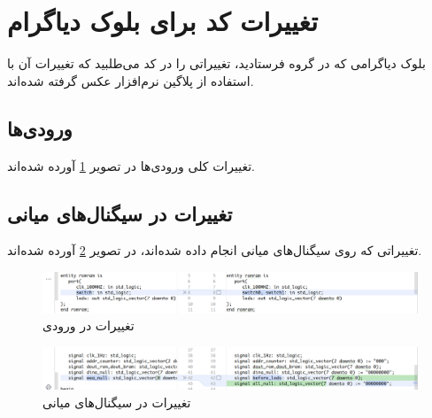 \documentclass[dvipsnames, svgnames, x11names, a4paper, 11pt]{article}
\begin{document}
\section{تغییرات کد برای بلوک دیاگرام}
بلوک دیاگرامی که در گروه فرستادید، تغییراتی را در کد 
می‌طلبید که تغییرات آن با استفاده از پلاگین  نرم‌افزار 
عکس گرفته شده‌اند.

\subsection{ورودی‌ها}
تغییرات کلی ورودی‌‌‌ها در تصویر 
\ref{fig:input-changes}
آورده شده‌اند.

\subsection{تغییرات در سیگنال‌های میانی}
تغییراتی که روی سیگنا‌ل‌های میانی انجام داده شده‌اند، در تصویر
\ref{fig:signal-changes}
آورده شده‌اند.

\begin{figure}[b]
\begin{center}
\includegraphics[width=0.90\textheight, height=0.15\textwidth, angle=90]{./images/input-switiches}
\end{center}
\caption{تغییرات در ورودی}
\label{fig:input-changes}
\end{figure}

\begin{figure}[b]
\begin{center}
\includegraphics[width=0.90\textheight, height=0.2\textwidth, angle=90]{./images/signal-changes}
\end{center}
\caption{تغییرات در سیگنا‌ل‌های میانی}
\label{fig:signal-changes}
\end{figure}
\listoffigures
\end{document}
